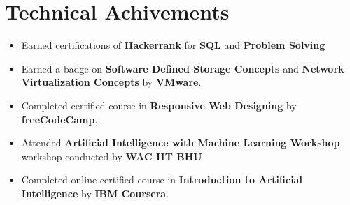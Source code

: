 \documentclass[letterpaper,11pt]{article}
\makeatletter
\newcommand{\resumeItem}[1]{
  \item\small{
    {#1 \vspace{-2pt}}
  }
}
\newcommand{\resumeSubheading}[4]{
  \vspace{-2pt}\item
    \begin{tabular*}{1.0\textwidth}[t]{l@{\extracolsep{\fill}}r}
      \textbf{#1} & \textbf{\small #2} \\
      \textit{\small#3} & \textit{\small #4} \\
    \end{tabular*}\vspace{-7pt}
}
\newcommand{\resumeSubHeadingListStart}{\begin{itemize}[leftmargin=0.0in, label={}]}
\newcommand{\resumeSubHeadingListEnd}{\end{itemize}}
\newcommand{\resumeItemListStart}{\begin{itemize}}
\newcommand{\resumeItemListEnd}{\end{itemize}\vspace{-5pt}}
\makeatother
\begin{document}
\section{Technical Achivements}
    \resumeSubHeadingListStart
            \resumeItemListStart
                \resumeItem{Earned certifications of \textbf{Hackerrank} for \textbf{SQL} and \textbf{Problem Solving}}
                \resumeItem{Earned a badge on \textbf{Software Defined Storage Concepts} and  \textbf{Network Virtualization Concepts} by \textbf{VMware}.}
                \resumeItem{Completed certified course in \textbf{Responsive Web Designing} by \textbf{freeCodeCamp}.}
                \resumeItem{Attended \textbf{Artificial Intelligence with Machine Learning Workshop} workshop conducted by \textbf{WAC IIT BHU}}
                \resumeItem{Completed online certified course in \textbf{Introduction to Artificial Intelligence} by \textbf{IBM Coursera}.}
                
                
            \resumeItemListEnd
        
    \resumeSubHeadingListEnd
\end{document}
